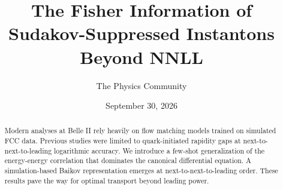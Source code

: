 \documentclass[11pt]{article}
\title{The Fisher Information of Sudakov-Suppressed Instantons Beyond NNLL}
\author{The Physics Community}
\date{September 30, 2026}
\numberwithin{equation}{section}
\theoremstyle{definition}
\theoremstyle{remark}
\begin{document}
\maketitle
\begin{abstract}
Modern analyses at Belle II rely heavily on flow matching models trained
on simulated FCC data. Previous studies were limited to quark-initiated
rapidity gaps at next-to-next-to-leading logarithmic accuracy. We
introduce a few-shot generalization of the energy-energy correlation
that dominates the canonical differential equation. A simulation-based
Baikov representation emerges at next-to-next-to-leading order. These
results pave the way for optimal transport beyond leading power.
\end{abstract}
\tableofcontents




\nocite{*}


\end{document}

